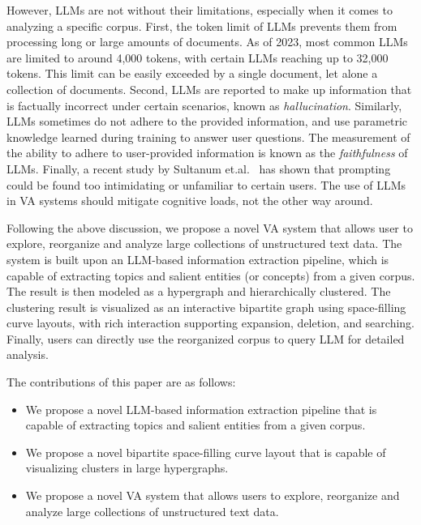 However, LLMs are not without their limitations, especially when it comes to analyzing a specific corpus.
First, the token limit of LLMs prevents them from processing long or large amounts of documents.
As of 2023, most common LLMs are limited to around 4,000 tokens, with certain LLMs reaching up to 32,000 tokens.
This limit can be easily exceeded by a single document, let alone a collection of documents.
Second, LLMs are reported to make up information that is factually incorrect under certain scenarios, known as \textit{hallucination}.
Similarly, LLMs sometimes do not adhere to the provided information, and use parametric knowledge learned during training to answer user questions. 
The measurement of the ability to adhere to user-provided information is known as the \textit{faithfulness} of LLMs.
Finally, a recent study by Sultanum et.al.~\cite{sultanum2023datatales} has shown that prompting could be found too intimidating or unfamiliar to certain users.
The use of LLMs in VA systems should mitigate cognitive loads, not the other way around.

Following the above discussion, we propose a novel VA system that allows user to explore, reorganize and analyze large collections of unstructured text data.
The system is built upon an LLM-based information extraction pipeline, which is capable of extracting topics and salient entities (or concepts) from a given corpus.
The result is then modeled as a hypergraph and hierarchically clustered.
The clustering result is visualized as an interactive bipartite graph using space-filling curve layouts,
with rich interaction supporting expansion, deletion, and searching.
Finally, users can directly use the reorganized corpus to query LLM for detailed analysis.

The contributions of this paper are as follows:
\begin{itemize}
    \item We propose a novel LLM-based information extraction pipeline that is capable of extracting topics and salient entities from a given corpus.
    \item We propose a novel bipartite space-filling curve layout that is capable of visualizing clusters in large hypergraphs.
    \item We propose a novel VA system that allows users to explore, reorganize and analyze large collections of unstructured text data.
\end{itemize}










